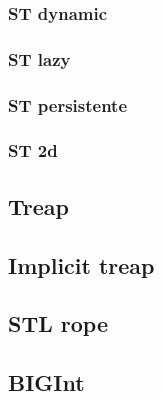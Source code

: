 \subsubsection{ST dynamic}

\subsubsection{ST lazy}

\subsubsection{ST persistente}

\subsubsection{ST 2d}


\subsection{Treap}

\subsection{Implicit treap}

\subsection{STL rope}



\subsection{BIGInt}

